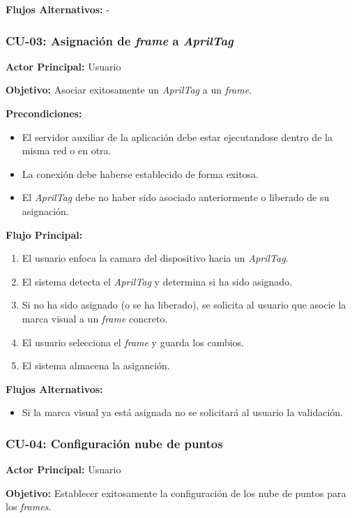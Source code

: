 \textbf{Flujos Alternativos:}
-

\subsubsection{CU-03: Asignación de \textit{frame} a \textit{AprilTag}}

\textbf{Actor Principal:} Usuario

\textbf{Objetivo:}
Asociar exitosamente un \textit{AprilTag} a un \textit{frame}.

\textbf{Precondiciones:}
\begin{itemize}
    \item El servidor auxiliar de la aplicación debe estar ejecutandose dentro de la misma red o en otra.
    \item La conexión debe haberse establecido de forma exitosa.
    \item El \textit{AprilTag} debe no haber sido asociado anteriormente o liberado de su asignación.
\end{itemize}

\textbf{Flujo Principal:}
\begin{enumerate}
    \item El usuario enfoca la camara del dispositivo hacia un \textit{AprilTag}.
    \item El sistema detecta el \textit{AprilTag} y determina si ha sido asignado.
    \item Si no ha sido asignado (o se ha liberado), se solicita al usuario que asocie la marca visual a un \textit{frame} concreto.
    \item El usuario selecciona el \textit{frame} y guarda los cambios.
    \item El sistema almacena la asiganción.
\end{enumerate}

\textbf{Flujos Alternativos:}
\begin{itemize}
    \item Si la marca visual ya está asignada no se solicitará al usuario la validación.
\end{itemize}

\subsubsection{CU-04: Configuración nube de puntos}

\textbf{Actor Principal:} Usuario

\textbf{Objetivo:}
Establecer exitosamente la configuración de los nube de puntos para los \textit{frames}.

